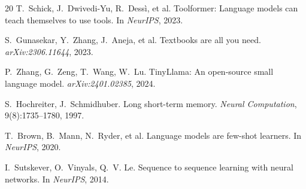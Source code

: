 \documentclass[10pt]{article}
\begin{document}
\begin{thebibliography}{20}
T.~Schick, J.~Dwivedi-Yu, R.~Dess\`{i}, et al.
Toolformer: Language models can teach themselves to use tools.
In \emph{NeurIPS}, 2023.

S.~Gunasekar, Y.~Zhang, J.~Aneja, et al.
Textbooks are all you need.
\emph{arXiv:2306.11644}, 2023.

P.~Zhang, G.~Zeng, T.~Wang, W.~Lu.
TinyLlama: An open-source small language model.
\emph{arXiv:2401.02385}, 2024.

S.~Hochreiter, J.~Schmidhuber.
Long short-term memory.
\emph{Neural Computation}, 9(8):1735--1780, 1997.

T.~Brown, B.~Mann, N.~Ryder, et al.
Language models are few-shot learners.
In \emph{NeurIPS}, 2020.

I.~Sutskever, O.~Vinyals, Q.~V. Le.
Sequence to sequence learning with neural networks.
In \emph{NeurIPS}, 2014.

\end{thebibliography}
\end{document}
